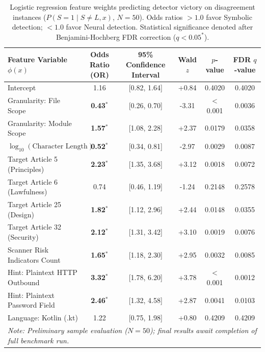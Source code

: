 \begin{table}[t]
\centering
\caption{Logistic regression feature weights predicting detector victory on disagreement instances ($P(S=1 \mid S \neq L, x)$, $N=50$). Odds ratios $>1.0$ favor Symbolic detection; $<1.0$ favor Neural detection. Statistical significance denoted after Benjamini-Hochberg FDR correction ($q < 0.05^*$).}
\label{tab:disagreement_regression}
\small
\begin{tabular}{lccccc}
\toprule
\textbf{Feature Variable $\phi(x)$} & \textbf{Odds Ratio (OR)} & \textbf{95\% Confidence Interval} & \textbf{Wald $z$} & \textbf{$p$-value} & \textbf{FDR $q$-value} \\
\midrule
Intercept & 1.16 & [0.82, 1.64] & +0.84 & 0.4020 & 0.4020 \\
Granularity: File Scope & \textbf{0.43}$^*$ & [0.26, 0.70] & -3.31 & < 0.001 & 0.0036 \\
Granularity: Module Scope & \textbf{1.57}$^*$ & [1.08, 2.28] & +2.37 & 0.0179 & 0.0358 \\
$\log_{10}(\text{Character Length})$ & \textbf{0.52}$^*$ & [0.34, 0.81] & -2.97 & 0.0029 & 0.0087 \\
Target Article 5 (Principles) & \textbf{2.23}$^*$ & [1.35, 3.68] & +3.12 & 0.0018 & 0.0072 \\
Target Article 6 (Lawfulness) & 0.74 & [0.46, 1.19] & -1.24 & 0.2148 & 0.2578 \\
Target Article 25 (Design) & \textbf{1.82}$^*$ & [1.12, 2.96] & +2.44 & 0.0148 & 0.0355 \\
Target Article 32 (Security) & \textbf{2.12}$^*$ & [1.31, 3.42] & +3.10 & 0.0019 & 0.0076 \\
Scanner Risk Indicators Count & \textbf{1.65}$^*$ & [1.18, 2.30] & +2.95 & 0.0032 & 0.0085 \\
Hint: Plaintext HTTP Outbound & \textbf{3.32}$^*$ & [1.78, 6.20] & +3.78 & < 0.001 & 0.0012 \\
Hint: Plaintext Password Field & \textbf{2.46}$^*$ & [1.32, 4.58] & +2.87 & 0.0041 & 0.0103 \\
Language: Kotlin (.kt) & 1.22 & [0.75, 1.98] & +0.80 & 0.4209 & 0.4209 \\
\midrule
\multicolumn{6}{l}{\textit{Note: Preliminary sample evaluation ($N=50$); final results await completion of full benchmark run.}} \\
\bottomrule
\end{tabular}
\end{table}
